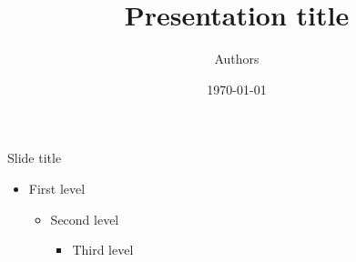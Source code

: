 \documentclass[hyperref={pdfpagemode=FullScreen},12pt,usenames,svgnames,aspectratio=169,usepdftitle=false]{beamer}
\begin{document}
\title{Presentation title}
\author{Authors}
\date{\today}
\maketitle

\begin{frame}{Slide title}

\begin{itemize}
    \item First level
    \begin{itemize}
        \item Second level
        \begin{itemize}
            \item Third level
        \end{itemize}
    \end{itemize}
\end{itemize}

\end{frame}
\end{document}
